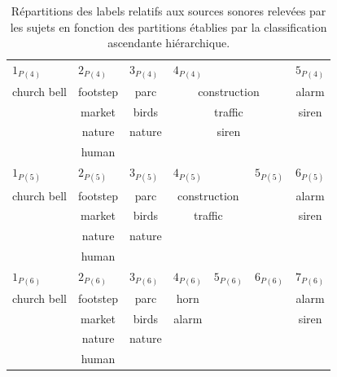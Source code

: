 \begin{table}[t]
\begin{tabular}{c|c|c|c|c|c|c}
\hline
\multicolumn{1}{l|}{$1_{P(4)}$} & \multicolumn{1}{l|}{$2_{P(4)}$} & \multicolumn{1}{l|}{$3_{P(4)}$}  & \multicolumn{3}{l|}{$4_{P(4)}$} & \multicolumn{1}{l}{$5_{P(4)}$} \\
church bell         & footstep   & parc   & \multicolumn{3}{c|}{construction} & alarm\\
                    & market     & birds  & \multicolumn{3}{c|}{traffic}      & siren\\
                    & nature     & nature & \multicolumn{3}{c|}{siren}        & \\
                    & human      &        & \multicolumn{3}{c|}{}             & \\
\hline
\multicolumn{1}{l|}{$1_{P(5)}$} & \multicolumn{1}{l|}{$2_{P(5)}$} & \multicolumn{1}{l|}{$3_{P(5)}$}  & \multicolumn{2}{l|}{$4_{P(5)}$} & \multicolumn{1}{l|}{$5_{P(5)}$} & \multicolumn{1}{l}{$6_{P(5)}$}\\ 
church bell          & footstep & parc   & \multicolumn{2}{c|}{construction} &     & alarm\\     
                     & market   & birds  & \multicolumn{2}{c|}{traffic}      &     & siren\\  
                     & nature   & nature & \multicolumn{2}{c|}{}             &     &  \\  
                     & human    &        & \multicolumn{2}{c|}{}             &     &  \\                  
\hline
\multicolumn{1}{l|}{$1_{P(6)}$} & \multicolumn{1}{l|}{$2_{P(6)}$} & \multicolumn{1}{l|}{$3_{P(6)}$}  & \multicolumn{1}{l|}{$4_{P(6)}$} & \multicolumn{1}{l|}{$5_{P(6)}$} & \multicolumn{1}{l|}{$6_{P(6)}$} & \multicolumn{1}{l}{$7_{P(6)}$} \\  
church bell          & footstep    & parc   & horn       &      &     & alarm \\        
                     & market      & birds  & alarm      &      &     & siren \\  
                     & nature      & nature &            &      &     & \\  
                     & human       &        &            &      &     & \\  
\hline
\end{tabular}
\vspace{0.5mm}
\caption{Répartitions des labels relatifs aux sources sonores relevées par les sujets en fonction des partitions établies par la classification ascendante hiérarchique.}
\label{tab:markerHacSource}
\end{table}

